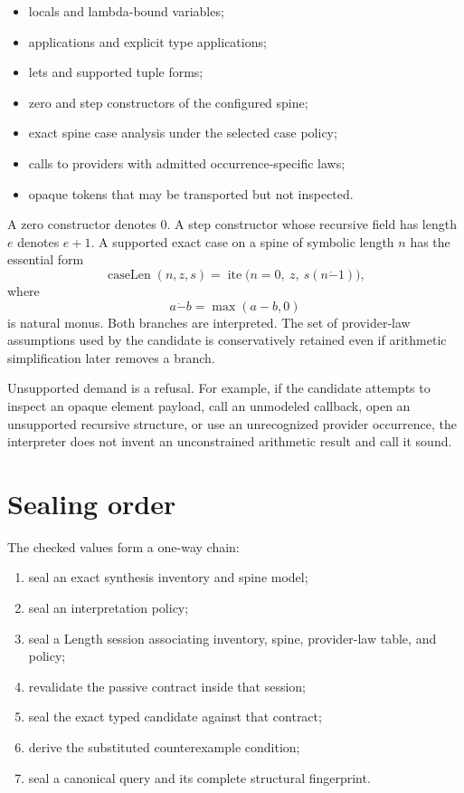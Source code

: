 \documentclass[10pt,letterpaper,oneside]{report}
\begin{document}
\begin{itemize}
\item locals and lambda-bound variables;
\item applications and explicit type applications;
\item lets and supported tuple forms;
\item zero and step constructors of the configured spine;
\item exact spine case analysis under the selected case policy;
\item calls to providers with admitted occurrence-specific laws;
\item opaque tokens that may be transported but not inspected.
\end{itemize}

A zero constructor denotes $0$. A step constructor whose recursive field has length $e$ denotes $e+1$. A supported exact case on a spine of symbolic length $n$ has the essential form
\[
  \operatorname{caseLen}(n,z,s)
  =\operatorname{ite}\bigl(n=0,\ z,\ s(n\mathbin{\dot{-}}1)\bigr),
\]
where
\[
  a\mathbin{\dot{-}}b=\max(a-b,0)
\]
is natural monus. Both branches are interpreted. The set of provider-law assumptions used by the candidate is conservatively retained even if arithmetic simplification later removes a branch.

Unsupported demand is a refusal. For example, if the candidate attempts to inspect an opaque element payload, call an unmodeled callback, open an unsupported recursive structure, or use an unrecognized provider occurrence, the interpreter does not invent an unconstrained arithmetic result and call it sound.

\section{Sealing order}

The checked values form a one-way chain:

\begin{enumerate}
\item seal an exact synthesis inventory and spine model;
\item seal an interpretation policy;
\item seal a Length session associating inventory, spine, provider-law table, and policy;
\item revalidate the passive contract inside that session;
\item seal the exact typed candidate against that contract;
\item derive the substituted counterexample condition;
\item seal a canonical query and its complete structural fingerprint.
\end{enumerate}
\end{document}
